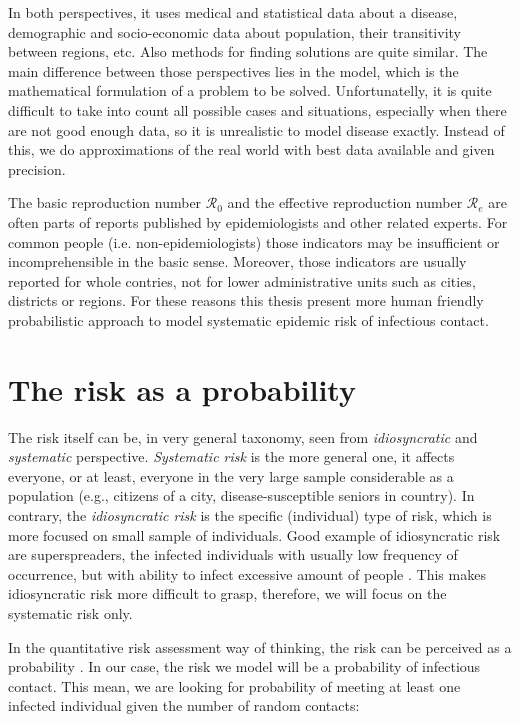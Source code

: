 \documentclass[
  digital, %
  oneside, %
  lof,     %
  lot,     %
]{fithesis4}
\begin{document}
In both perspectives, it uses medical and statistical data about a 
disease, demographic and socio-economic data about population, 
their transitivity between regions, etc. 
Also methods for finding solutions are quite similar. 
The main difference between those perspectives lies in the model, 
which is the mathematical formulation of a problem to be solved. 
Unfortunatelly, it is quite difficult to take into count all 
possible cases and situations, especially when there are not 
good enough data, so it is unrealistic to model disease exactly. 
Instead of this, we do approximations of the real world 
with best data available and given precision.

The basic reproduction number $\mathcal{R}_0$ and the effective 
reproduction number $\mathcal{R}_e$ are often parts of reports 
published by epidemiologists and other related experts.
For common people (i.e. non-epidemiologists) those indicators 
may be insufficient or incomprehensible in the basic sense.
Moreover, those indicators are usually reported for whole contries, 
not for lower administrative units such as cities, districts or regions. 
For these reasons this thesis present more human friendly 
probabilistic approach to model systematic epidemic risk of
infectious contact.


\chapter{The risk as a probability}
\label{chap:risk-as-probability}

The risk itself can be, in very general taxonomy, seen from
\textit{idiosyncratic} and \textit{systematic} perspective.
\textit{Systematic risk} is the more general one, it affects everyone, 
or at least, everyone in the very large sample considerable as a population
(e.g., citizens of a city, disease-susceptible seniors in country).
In contrary, the \textit{idiosyncratic risk} is the specific (individual) type of risk,
which is more focused on small sample of individuals.
Good example of idiosyncratic risk are superspreaders, the infected
individuals with usually low frequency of occurrence, but with ability to
infect excessive amount of people \cite[Chapter~4]{brauer2008}.
This makes idiosyncratic risk more difficult to grasp, therefore, 
we will focus on the systematic risk only.

In the quantitative risk assessment way of thinking, the risk can be
perceived as a probability \cite[Chapter~14]{bahr2014}.
In our case, the risk we model will be a 
probability of infectious contact. This mean, we are 
looking for probability of meeting at least one
infected individual given the number of random contacts:
\end{document}
